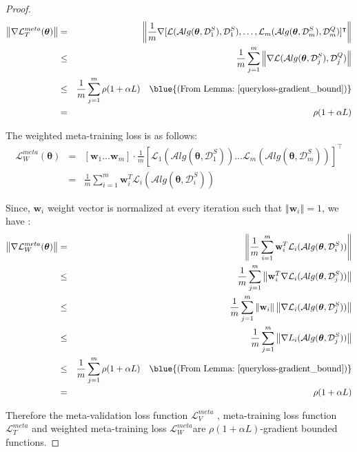 \begin{proof}
\begin{eqnarray}
    \left\Vert\nabla {\mathcal{L}}_{T}^{meta}(\boldsymbol{\theta})\right\Vert &=& \left\Vert\frac{1}{m}\nabla[\mathcal{L}(\mathcal{A}lg(\boldsymbol{\theta},\mathcal{D}_1^{S}), \mathcal{D}_1^{S}), \dots, \mathcal{L}_{m}(\mathcal{A}lg(\boldsymbol{\theta},\mathcal{D}_m^{S}), \mathcal{D}_m^{Q})]^{\intercal}\right\Vert \nonumber \\
    &\leq&\frac{1}{m}\sum_{j=1}^{m}\left\Vert\nabla\mathcal{L}(\mathcal{A}lg(\boldsymbol{\theta},\mathcal{D}_j^{S}), \mathcal{D}_j^{Q})\right\Vert \nonumber \\
    &\leq&\frac{1}{m}\sum_{j=1}^{m}\rho(1+\alpha L) \quad \blue{\text{(From Lemma:~\ref{queryloss-gradient_bound})}} \nonumber \\
    &=&\rho(1+\alpha L)
\end{eqnarray}

The weighted meta-training loss is as follows:
\begin{eqnarray}
   {\mathcal{L}}_{W}^{meta}(\boldsymbol{\theta}) &=& [\mathbf{w}_1\dots\mathbf{w}_m] \cdot \frac{1}{m}[\mathcal{L}_{1}(\mathcal{A}lg(\boldsymbol{\theta},\mathcal{D}_1^{S})) \dots \mathcal{L}_{m}(\mathcal{A}lg(\boldsymbol{\theta},\mathcal{D}_m^{S}))]^{\intercal} \nonumber \\
   &=& \frac{1}{m}\sum_{i=1}^{m}\mathbf{w}_i^T\mathcal{L}_{i}(\mathcal{A}lg(\boldsymbol{\theta},\mathcal{D}_i^{S})) 
\end{eqnarray}

Since, $\mathbf{w}_i$ weight vector is normalized at every iteration such that $\left\Vert\mathbf{w}_i\right\Vert = 1$, we have :
\begin{eqnarray}
    \left\Vert\nabla {\mathcal{L}}_{W}^{meta}(\boldsymbol{\theta})\right\Vert &=& \left\Vert\frac{1}{m}\sum_{i=1}^{m}\mathbf{w}_i^T\mathcal{L}_{i}(\mathcal{A}lg(\boldsymbol{\theta},\mathcal{D}_i^{S}))\right\Vert \nonumber \\
    &\leq&\frac{1}{m}\sum_{j=1}^{m}\left\Vert\mathbf{w}_i^T \nabla\mathcal{L}_i(\mathcal{A}lg(\boldsymbol{\theta},\mathcal{D}_j^{S}))\right\Vert \nonumber \\
    &\leq&\frac{1}{m}\sum_{j=1}^{m}\left\Vert\mathbf{w}_i \right\Vert \left\Vert\nabla\mathcal{L}_i(\mathcal{A}lg(\boldsymbol{\theta},\mathcal{D}_j^{S}))\right\Vert  \nonumber\\
    &\leq&\frac{1}{m}\sum_{j=1}^{m}\left\Vert\mathcal\nabla{L}_i(\mathcal{A}lg(\boldsymbol{\theta},\mathcal{D}_j^{S}))\right\Vert \nonumber\\
    &\leq&\frac{1}{m}\sum_{j=1}^{m}\rho(1+\alpha L) \quad \blue{\text{(From Lemma:~\ref{queryloss-gradient_bound})}} \nonumber \\
    &=&\rho(1+\alpha L)
\end{eqnarray}


Therefore the meta-validation loss function $\mathcal{L}_V^{meta}$ , meta-training loss function $\mathcal{L}_T^{meta}$ and weighted meta-training loss $\mathcal{L}_W^{meta}$are $\rho(1+\alpha L)$-gradient bounded functions.
\end{proof}


